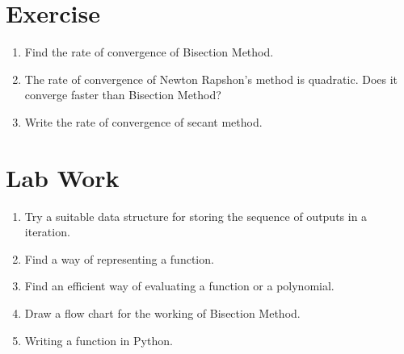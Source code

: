 \documentclass[aima203_lecturenotes_ku.tex]{subfiles}
\begin{document}
\section{Exercise}
\begin{enumerate}
\item Find the rate of convergence of Bisection Method.
\item The rate of convergence of Newton Rapshon's method is quadratic. Does it converge faster than Bisection Method?
\item Write the rate of convergence of secant method.
\end{enumerate}

\section{Lab Work}
\begin{enumerate}
\item Try a suitable data structure for storing the sequence of outputs in a iteration.
\item Find a way of representing a function.
\item Find an efficient way of evaluating a function or a polynomial.
\item Draw a flow chart for the working of Bisection Method.
\item Writing a function in Python.
\end{enumerate}
\end{document}
